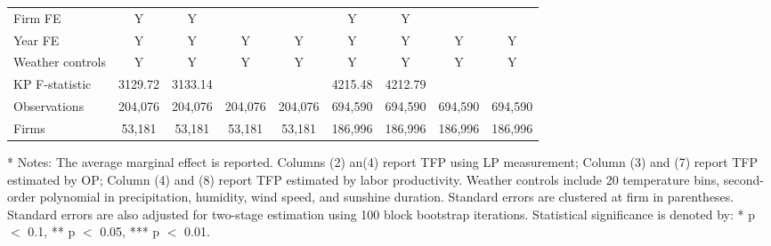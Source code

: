 \documentclass[12pt]{article}
\begin{document}
\begin{table}[H]
{\begin{tabular}{l*{8}{c}}
    \hline
    Firm FE              &Y&Y& & &Y&Y & & \\
    Year FE              &Y&Y&Y&Y&Y&Y&Y&Y\\
    Weather controls     &Y&Y&Y&Y&Y&Y&Y&Y\\
    KP F-statistic       &3129.72&3133.14&&&4215.48&4212.79&&\\
    Observations         &204,076&204,076&204,076 &204,076  &694,590  &694,590 &694,590&694,590\\
    Firms                &53,181 &53,181 &53,181  &53,181   &186,996	&186,996 &186,996&186,996 \\
    \hline\hline
  \end{tabular}
  }
  \begin{tablenotes}
    \item[*] \small Notes: The average marginal effect is reported. Columns (2) an(4) report TFP using LP measurement;
    Column (3) and (7) report TFP estimated by OP; Column (4) and (8) report TFP estimated by labor productivity. Weather controls include 20 temperature bins, second-order polynomial in precipitation, humidity, wind speed, and sunshine duration. Standard errors are clustered at firm in parentheses. Standard errors are also adjusted for two-stage estimation using 100 block bootstrap iterations. Statistical significance is denoted by: * p $<$ 0.1, ** p $<$ 0.05, *** p $<$ 0.01.
  \end{tablenotes}
\end{table}
\end{document}
